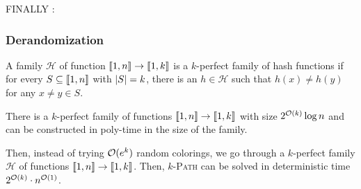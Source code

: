 \documentclass{cours}
\begin{document}
FINALLY : 
\subsubsection{Derandomization}
\begin{definition}
    A family $\mathcal{H}$ of function $\left\llbracket 1, n\right\rrbracket \rightarrow \left\llbracket 1, k\right\rrbracket$ is a $k$-perfect family of hash functions if for every $S \subseteq \left\llbracket 1, n\right\rrbracket$ with $\left|S\right| = k$, there is an $h \in \mathcal{H}$ such that $h(x) \neq h(y)$ for any $x\neq y \in S$.
\end{definition}

\begin{theorem}
    There is a $k$-perfect family of functions $\left\llbracket 1, n\right\rrbracket \rightarrow \left\llbracket 1, k\right\rrbracket$ with size $2^{\mathcal{O}(k)}\log n$ and can be constructed in poly-time in the size of the family. 
\end{theorem}

Then, instead of trying $\mathcal{O}(e^{k})$ random colorings, we go through a $k$-perfect family $\mathcal{H}$ of functions $\left\llbracket 1, n\right\rrbracket \rightarrow \left\llbracket 1, k\right\rrbracket$. Then, $k$-\textsc{Path} can be solved in deterministic time $2^{\mathcal{O}(k)}\cdot n^{\mathcal{O}(1)}$.
\end{document}
